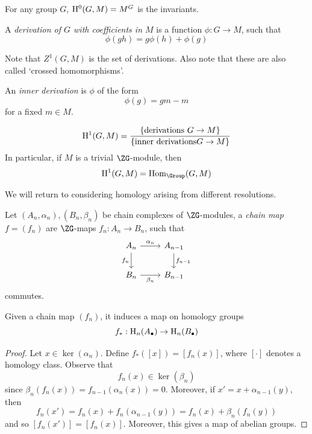\documentclass{article}
\begin{document}
\begin{corollary}
    For any group \(G\), \(\mathrm{H}^0(G, M) = M^G\) is the invariants.
\end{corollary}

\begin{definition}
    A \emph{derivation of \(G\) with coefficients in \(M\)}  is a function \(\phi : G \to M\), such that
    \[\phi(gh) = g\phi(h) + \phi(g)\]
\end{definition}
Note that \(Z^1(G, M)\) is the set of derivations. Also note that these are also called `crossed homomorphisms'.

An \emph{inner derivation} is \(\phi\) of the form
\[\phi(g) = gm - m\]
for a fixed \(m \in M\).

\begin{corollary}
    \[\mathrm{H}^1(G, M) = \frac{\{\text{derivations }G \to M\}}{\{\text{inner derivations} G \to M\}}\]
    In particular, if \(M\) is a trivial \(\ZG\)-module, then
    \[\HH^1(G, M) = \Hom_\Group(G, M)\]
\end{corollary}

We will return to considering homology arising from different resolutions.

\begin{definition}
    Let \((A_n, \alpha_n), (B_n, \beta_n)\) be chain complexes of \(\ZG\)-modules, a \emph{chain map} \(f = (f_n)\) are \(\ZG\)-maps \(f_n : A_n \to B_n\), such that
\[\begin{tikzcd}
	{A_n} & {A_{n-1}} \\
	{B_n} & {B_{n-1}}
	\arrow["{\alpha_n}", from=1-1, to=1-2]
	\arrow["{\beta_n}"', from=2-1, to=2-2]
	\arrow["{f_n}"', from=1-1, to=2-1]
	\arrow["{f_{n-1}}", from=1-2, to=2-2]
\end{tikzcd}\]
    commutes.
\end{definition}

\begin{lemma}
    Given a chain map \((f_n)\), it induces a map on homology groups
    \[f_* : \mathrm{H}_n(A_\bullet) \to \mathrm{H}_n(B_\bullet)\]
\end{lemma}

\lec

\begin{proof}
    Let \(x \in \ker(\alpha_n)\). Define \(f_*([x]) = [f_n(x)]\), where \([\cdot]\) denotes a homology class. Observe that
    \[f_n(x) \in \ker(\beta_n)\]
    since \(\beta_n(f_n(x)) = f_{n-1}(\alpha_n(x)) = 0\). Moreover, if \(x' = x + \alpha_{n-1}(y)\), then
    \[f_n(x') = f_n(x) + f_n(\alpha_{n-1}(y)) = f_n(x) + \beta_n(f_n(y))\]
    and so \([f_n(x')] = [f_n(x)]\). Moreover, this gives a map of abelian groups. 
\end{proof}
\end{document}
